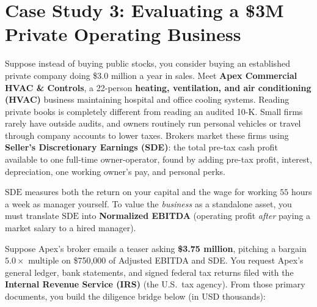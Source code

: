 \section{Case Study 3: Evaluating a \$3M Private Operating Business}

Suppose instead of buying public stocks, you consider buying an established private company doing \$3.0 million a year in sales. Meet \textbf{Apex Commercial HVAC \& Controls}, a 22-person \textbf{heating, ventilation, and air conditioning (HVAC)} business maintaining hospital and office cooling systems. Reading private books is completely different from reading an audited 10-K. Small firms rarely have outside audits, and owners routinely run personal vehicles or travel through company accounts to lower taxes. Brokers market these firms using \textbf{Seller's Discretionary Earnings (SDE)}: the total pre-tax cash profit available to one full-time owner-operator, found by adding pre-tax profit, interest, depreciation, one working owner's pay, and personal perks.

$\text{SDE}$ measures both the return on your capital and the wage for working $55$ hours a week as manager yourself. To value the \emph{business} as a standalone asset, you must translate $\text{SDE}$ into \textbf{Normalized EBITDA} (operating profit \emph{after} paying a market salary to a hired manager).

Suppose Apex's broker emails a teaser asking \textbf{\$3.75 million}, pitching a bargain $5.0\times$ multiple on \$750,000 of Adjusted EBITDA and SDE. You request Apex's general ledger, bank statements, and signed federal tax returns filed with the \textbf{Internal Revenue Service (IRS)} (the U.S.\ tax agency). From those primary documents, you build the diligence bridge below (in USD thousands):

